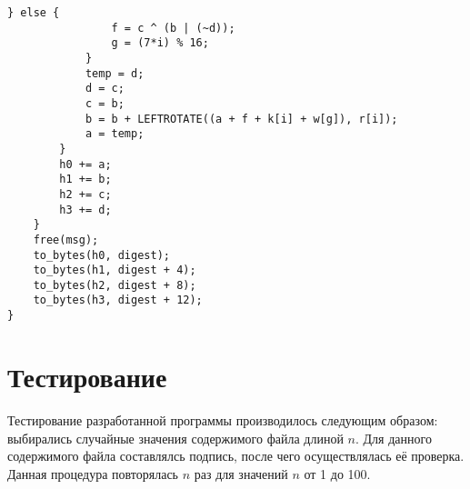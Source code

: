 \clearpage

\begin{center}
    \captionsetup{justification=raggedright,singlelinecheck=off}
    \begin{lstlisting}[label=lst:md5-2,caption=Реализация алгоритма хеширования MD5 часть 2]
            } else {
                f = c ^ (b | (~d));
                g = (7*i) % 16;
            }
            temp = d;
            d = c;
            c = b;
            b = b + LEFTROTATE((a + f + k[i] + w[g]), r[i]);
            a = temp;
        }
        h0 += a;
        h1 += b;
        h2 += c;
        h3 += d;
    }
    free(msg);
    to_bytes(h0, digest);
    to_bytes(h1, digest + 4);
    to_bytes(h2, digest + 8);
    to_bytes(h3, digest + 12);
}
\end{lstlisting}
\end{center}


\section{Тестирование}

Тестирование разработанной программы производилось следующим образом: выбирались случайные значения содержимого файла длиной $n$. Для данного содержимого файла составлялсь подпись, после чего осуществлялась её проверка. Данная процедура повторялась $n$ раз для значений $n$ от 1 до 100.

\clearpage

